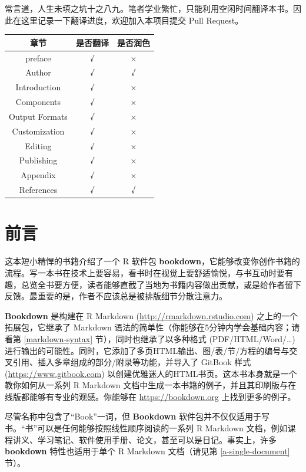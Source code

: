 \documentclass[
  12pt,
]{krantz}
\theoremstyle{definition}
\theoremstyle{definition}
\theoremstyle{definition}
\theoremstyle{definition}
\theoremstyle{remark}
\begin{document}
常言道，人生未填之坑十之八九。笔者学业繁忙，只能利用空闲时间翻译本书。因此在这里记录一下翻译进度，欢迎加入本项目提交 Pull Request。

\begin{longtable}[]{@{}ccc@{}}
\toprule\noalign{}
章节 & 是否翻译 & 是否润色 \\
\midrule\noalign{}
\endhead
\bottomrule\noalign{}
\endlastfoot
preface & √ & × \\
Author & √ & √ \\
Introduction & √ & × \\
Components & √ & × \\
Output Formats & √ & × \\
Customization & √ & × \\
Editing & √ & × \\
Publishing & √ & × \\
Appendix & √ & × \\
References & √ & √ \\
\end{longtable}

\hypertarget{ux524dux8a00}{%
\chapter*{前言}\label{ux524dux8a00}}


这本短小精悍的书籍介绍了一个 R 软件包 \textbf{bookdown}，它能够改变你创作书籍的流程。写一本书在技术上要容易，看书时在视觉上要舒适愉悦，与书互动时要有趣，总览全书要方便，读者能够直截了当地为书籍内容做出贡献，或是给作者留下反馈。最重要的是，作者不应该总是被排版细节分散注意力。

\textbf{Bookdown} 是构建在 R Markdown (\url{http://rmarkdown.rstudio.com}) 之上的一个拓展包，它继承了 Markdown 语法的简单性（你能够在5分钟内学会基础内容；请看第 \ref{markdown-syntax} 节），同时也继承了以多种格式 (PDF/HTML/Word/\ldots) 进行输出的可能性。同时，它添加了多页HTML输出、图/表/节/方程的编号与交叉引用、插入多章组成的部分/附录等功能，并导入了 GitBook 样式 (\url{https://www.gitbook.com}) 以创建优雅迷人的HTML书页。这本书本身就是一个教你如何从一系列 R Markdown 文档中生成一本书籍的例子，并且其印刷版与在线版都能够有专业的观感。你能够在 \url{https://bookdown.org} 上找到更多的例子。

尽管名称中包含了``Book''一词，但 \textbf{Bookdown} 软件包并不仅仅适用于写书。``书''可以是任何能够按照线性顺序阅读的一系列 R Markdown 文档，例如课程讲义、学习笔记、软件使用手册、论文，甚至可以是日记。事实上，许多 \textbf{bookdown} 特性也适用于单个 R Markdown 文档（请见第 \ref{a-single-document} 节）。
\end{document}
